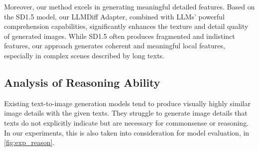 Moreover, our method excels in generating meaningful detailed features. Based on the SD1.5 model, our LLMDiff Adapter, combined with LLMs' powerful comprehension capabilities, significantly enhances the texture and detail quality of generated images. While SD1.5 often produces fragmented and indistinct features, our approach generates coherent and meaningful local features, especially in complex scenes described by long texts.



\subsection{Analysis of Reasoning Ability}
Existing text-to-image generation models tend to produce visually highly similar image details with the given texts. 
They struggle to generate image details that texts do not explicitly indicate but are necessary for commonsense or reasoning.
In our experiments, this is also taken into consideration for model evaluation, in \cref{fig:exp_reason}. 


